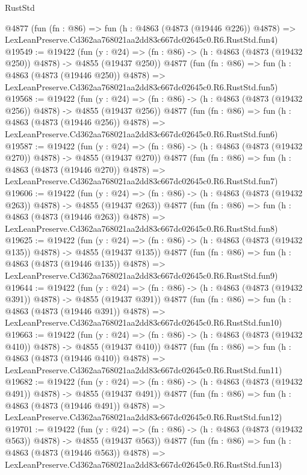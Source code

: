 \begin{lexlean}{RustStd}
\begin{coremodule}
    @4877
    (fun (fn : @86) =>
    fun (h : @4863 (@4873 (@19446 @226)) @4878) =>
    LexLeanPreserve.Cd362aa768021aa2dd83c667dc02645c0.R6.RustStd.fun4)
@19549 := @19422
    (fun (y : @24) => (fn : @86) -> (h : @4863 (@4873 (@19432 @250)) @4878) -> @4855 (@19437 @250))
    @4877
    (fun (fn : @86) =>
    fun (h : @4863 (@4873 (@19446 @250)) @4878) =>
    LexLeanPreserve.Cd362aa768021aa2dd83c667dc02645c0.R6.RustStd.fun5)
@19568 := @19422
    (fun (y : @24) => (fn : @86) -> (h : @4863 (@4873 (@19432 @256)) @4878) -> @4855 (@19437 @256))
    @4877
    (fun (fn : @86) =>
    fun (h : @4863 (@4873 (@19446 @256)) @4878) =>
    LexLeanPreserve.Cd362aa768021aa2dd83c667dc02645c0.R6.RustStd.fun6)
@19587 := @19422
    (fun (y : @24) => (fn : @86) -> (h : @4863 (@4873 (@19432 @270)) @4878) -> @4855 (@19437 @270))
    @4877
    (fun (fn : @86) =>
    fun (h : @4863 (@4873 (@19446 @270)) @4878) =>
    LexLeanPreserve.Cd362aa768021aa2dd83c667dc02645c0.R6.RustStd.fun7)
@19606 := @19422
    (fun (y : @24) => (fn : @86) -> (h : @4863 (@4873 (@19432 @263)) @4878) -> @4855 (@19437 @263))
    @4877
    (fun (fn : @86) =>
    fun (h : @4863 (@4873 (@19446 @263)) @4878) =>
    LexLeanPreserve.Cd362aa768021aa2dd83c667dc02645c0.R6.RustStd.fun8)
@19625 := @19422
    (fun (y : @24) => (fn : @86) -> (h : @4863 (@4873 (@19432 @135)) @4878) -> @4855 (@19437 @135))
    @4877
    (fun (fn : @86) =>
    fun (h : @4863 (@4873 (@19446 @135)) @4878) =>
    LexLeanPreserve.Cd362aa768021aa2dd83c667dc02645c0.R6.RustStd.fun9)
@19644 := @19422
    (fun (y : @24) => (fn : @86) -> (h : @4863 (@4873 (@19432 @391)) @4878) -> @4855 (@19437 @391))
    @4877
    (fun (fn : @86) =>
    fun (h : @4863 (@4873 (@19446 @391)) @4878) =>
    LexLeanPreserve.Cd362aa768021aa2dd83c667dc02645c0.R6.RustStd.fun10)
@19663 := @19422
    (fun (y : @24) => (fn : @86) -> (h : @4863 (@4873 (@19432 @410)) @4878) -> @4855 (@19437 @410))
    @4877
    (fun (fn : @86) =>
    fun (h : @4863 (@4873 (@19446 @410)) @4878) =>
    LexLeanPreserve.Cd362aa768021aa2dd83c667dc02645c0.R6.RustStd.fun11)
@19682 := @19422
    (fun (y : @24) => (fn : @86) -> (h : @4863 (@4873 (@19432 @491)) @4878) -> @4855 (@19437 @491))
    @4877
    (fun (fn : @86) =>
    fun (h : @4863 (@4873 (@19446 @491)) @4878) =>
    LexLeanPreserve.Cd362aa768021aa2dd83c667dc02645c0.R6.RustStd.fun12)
@19701 := @19422
    (fun (y : @24) => (fn : @86) -> (h : @4863 (@4873 (@19432 @563)) @4878) -> @4855 (@19437 @563))
    @4877
    (fun (fn : @86) =>
    fun (h : @4863 (@4873 (@19446 @563)) @4878) =>
    LexLeanPreserve.Cd362aa768021aa2dd83c667dc02645c0.R6.RustStd.fun13)

\end{coremodule}
\end{lexlean}
